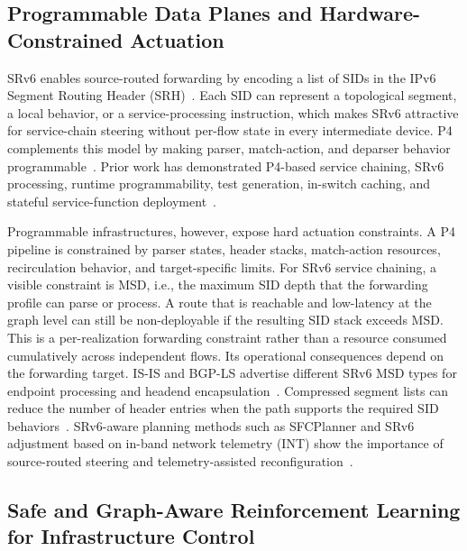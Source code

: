 \documentclass[final,5p]{elsarticle}
\newcommand{\rev}[1]{\textcolor{revisiongreen}{#1}}
\let\newrev\rev
\begin{document}
\subsection{Programmable Data Planes and Hardware-Constrained Actuation}
\label{subsec:related_pdp}

SRv6 enables source-routed forwarding by encoding a list of SIDs in the IPv6 \newrev{Segment Routing Header (SRH)}~\cite{filsfils2015segment,rfc8986,rfc9352}. Each SID can represent a topological segment, a local behavior, or a service-processing instruction, which makes SRv6 attractive for service-chain steering without per-flow state in every intermediate device. P4 complements this model by making parser, match-action, and deparser behavior programmable~\cite{jeyakumar2014p4}. Prior work has demonstrated P4-based service chaining, SRv6 processing, runtime programmability, test generation, in-switch caching, and stateful service-function deployment~\cite{stockmayer2020p4sfc,xiang2019p4sc,yang2024p4runpro,ruffy2023p4testgen,zhao2023p4lru,ma2024sfcache,li2024stsfc}.

Programmable infrastructures, however, expose hard actuation constraints. A P4 pipeline is constrained by parser states, header stacks, match-action resources, recirculation behavior, and target-specific limits. For SRv6 service chaining, a visible constraint is \rev{MSD}, i.e., the maximum SID depth that the forwarding profile can parse or process. A route that is reachable and low-latency at the graph level can still be non-deployable if the resulting SID stack exceeds MSD. \rev{This is a per-realization forwarding constraint rather than a resource consumed cumulatively across independent flows. Its operational consequences depend on the forwarding target. IS-IS and BGP-LS advertise different SRv6 MSD types for endpoint processing and headend encapsulation~\cite{rfc9352,rfc9514}. Compressed segment lists can reduce the number of header entries when the path supports the required SID behaviors~\cite{rfc9800}.} SRv6-aware planning methods such as SFCPlanner and SRv6 adjustment based on \newrev{in-band network telemetry (INT)} show the importance of source-routed steering and telemetry-assisted reconfiguration~\cite{qiu2024sfcplanner,yan2024srv6int}.

\subsection{Safe and Graph-Aware Reinforcement Learning for Infrastructure Control}
\label{subsec:related_safe_rl}
\end{document}
